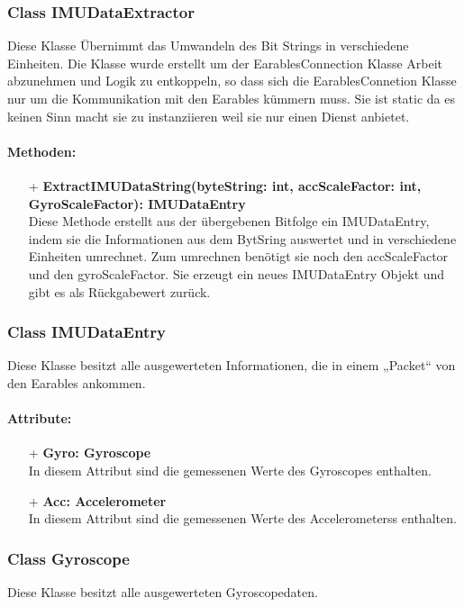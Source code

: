 \documentclass[a4paper,12pt]{article}
\begin{document}
\subsubsection{Class IMUDataExtractor}
Diese Klasse Übernimmt das Umwandeln des Bit Strings in verschiedene Einheiten.
Die Klasse wurde erstellt um der EarablesConnection Klasse Arbeit abzunehmen und Logik zu entkoppeln, so dass sich die EarablesConnetion
 Klasse nur um die Kommunikation mit den Earables kümmern muss. Sie ist static da es keinen Sinn macht sie zu instanziieren weil sie nur einen Dienst anbietet.

\paragraph{Methoden:}
\begin{itemize}
	\item[+] \textbf{ExtractIMUDataString(byteString: int, accScaleFactor: int, GyroScaleFactor): IMUDataEntry}\\Diese Methode erstellt aus der übergebenen Bitfolge ein IMUDataEntry, indem sie die Informationen aus dem BytSring auswertet und in verschiedene Einheiten umrechnet. Zum umrechnen benötigt sie noch den accScaleFactor und den gyroScaleFactor. Sie erzeugt ein neues IMUDataEntry Objekt und gibt es als Rückgabewert zurück.
\end{itemize}


\subsubsection{Class IMUDataEntry}
Diese Klasse besitzt alle ausgewerteten Informationen, die in einem „Packet“ von den Earables ankommen.

\paragraph{Attribute:}
\begin{itemize}
	\item[+] \textbf{Gyro: Gyroscope}\\In diesem Attribut sind die gemessenen Werte des Gyroscopes enthalten.
	\item[+] \textbf{Acc: Accelerometer}\\In diesem Attribut sind die gemessenen Werte des Accelerometerss enthalten.
\end{itemize}


\subsubsection{Class Gyroscope}
Diese Klasse besitzt alle ausgewerteten Gyroscopedaten.
\end{document}
